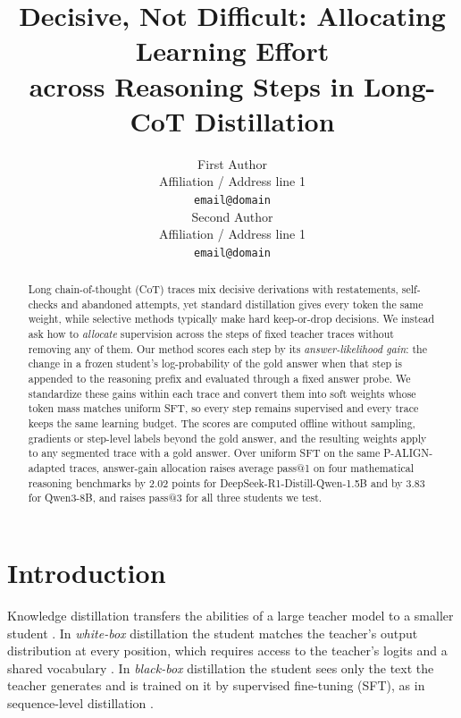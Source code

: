 \documentclass[11pt]{article}
\title{Decisive, Not Difficult: Allocating Learning Effort\\across Reasoning Steps in Long-CoT Distillation}
\author{First Author \\
  Affiliation / Address line 1 \\
  \texttt{email@domain} \\\And
  Second Author \\
  Affiliation / Address line 1 \\
  \texttt{email@domain} \\}
\begin{document}
\maketitle
\begin{abstract}
Long chain-of-thought (CoT) traces mix decisive derivations with restatements, self-checks and abandoned attempts, yet standard distillation gives every token the same weight, while selective methods typically make hard keep-or-drop decisions.
We instead ask how to \emph{allocate} supervision across the steps of fixed teacher traces without removing any of them.
Our method scores each step by its \emph{answer-likelihood gain}: the change in a frozen student's log-probability of the gold answer when that step is appended to the reasoning prefix and evaluated through a fixed answer probe.
We standardize these gains within each trace and convert them into soft weights whose token mass matches uniform SFT, so every step remains supervised and every trace keeps the same learning budget.
The scores are computed offline without sampling, gradients or step-level labels beyond the gold answer, and the resulting weights apply to any segmented trace with a gold answer.
Over uniform SFT on the same P-ALIGN-adapted traces, answer-gain allocation raises average pass@1 on four mathematical reasoning benchmarks by 2.02 points for DeepSeek-R1-Distill-Qwen-1.5B and by 3.83 for Qwen3-8B, and raises pass@3 for all three students we test.

\end{abstract}

\section{Introduction}

Knowledge distillation transfers the abilities of a large teacher model to a smaller student \citep{hinton2015distilling}.
In \emph{white-box} distillation the student matches the teacher's output distribution at every position, which requires access to the teacher's logits and a shared vocabulary \citep{gu2024minillm,agarwal2024gkd}.
In \emph{black-box} distillation the student sees only the text the teacher generates and is trained on it by supervised fine-tuning (SFT), as in sequence-level distillation \citep{kim2016sequence}.
\end{document}
